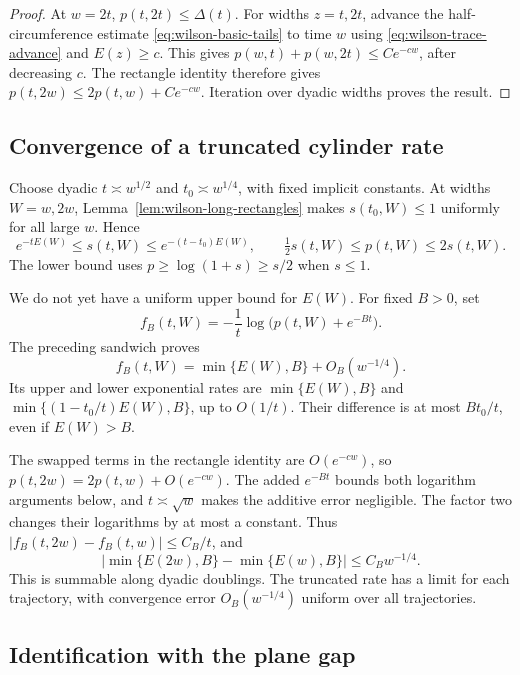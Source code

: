 \begin{proof}
At $w=2t$, $p(t,2t)\le\Delta(t)$. For widths $z=t,2t$,
advance the half-circumference estimate
\eqref{eq:wilson-basic-tails} to time $w$ using
\eqref{eq:wilson-trace-advance} and $E(z)\ge c$.
This gives $p(w,t)+p(w,2t)\le Ce^{-cw}$, after decreasing $c$.
The rectangle identity therefore gives
$p(t,2w)\le2p(t,w)+Ce^{-cw}$.
Iteration over dyadic widths proves the result.
\end{proof}

\subsection{Convergence of a truncated cylinder rate}

Choose dyadic $t\asymp w^{1/2}$ and $t_0\asymp w^{1/4}$,
with fixed implicit constants. At widths $W=w,2w$,
Lemma~\ref{lem:wilson-long-rectangles} makes
$s(t_0,W)\le1$ uniformly for all large $w$. Hence
\begin{equation}
 e^{-tE(W)}\le s(t,W)\le e^{-(t-t_0)E(W)},\qquad
 \tfrac12s(t,W)\le p(t,W)\le2s(t,W).
 \label{eq:wilson-short-time-sandwich}
\end{equation}
The lower bound uses $p\ge\log(1+s)\ge s/2$ when $s\le1$.

We do not yet have a uniform upper bound for $E(W)$.
For fixed $B>0$, set
\[
 f_B(t,W)=-\frac1t\log\bigl(p(t,W)+e^{-Bt}\bigr).
\]
The preceding sandwich proves
\begin{equation}
 f_B(t,W)=\min\{E(W),B\}+O_B(w^{-1/4}).
 \label{eq:wilson-capped-rate}
\end{equation}
Its upper and lower exponential rates are
$\min\{E(W),B\}$ and
$\min\{(1-t_0/t)E(W),B\}$, up to $O(1/t)$.
Their difference is at most $Bt_0/t$, even if $E(W)>B$.

The swapped terms in the rectangle identity are $O(e^{-cw})$,
so $p(t,2w)=2p(t,w)+O(e^{-cw})$. The added $e^{-Bt}$ bounds
both logarithm arguments below, and $t\asymp\sqrt w$ makes
the additive error negligible. The factor two changes their
logarithms by at most a constant. Thus
$|f_B(t,2w)-f_B(t,w)|\le C_B/t$, and
\[
 |\min\{E(2w),B\}-\min\{E(w),B\}|\le C_Bw^{-1/4}.
\]
This is summable along dyadic doublings. The truncated rate
has a limit for each trajectory, with convergence error
$O_B(w^{-1/4})$ uniform over all trajectories.

\subsection{Identification with the plane gap}

